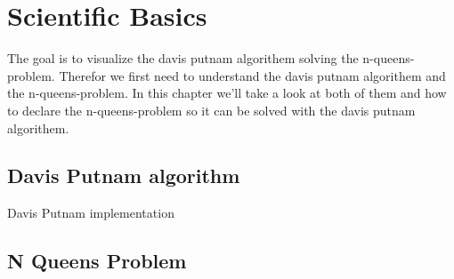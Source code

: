 

\chapter{Scientific Basics}

The goal is to visualize the davis putnam algorithem solving the n-queens-problem.
Therefor we first need to understand the davis putnam algorithem and the n-queens-problem.
In this chapter we'll take a look at both of them and how to declare the n-queens-problem so it can be solved with the davis putnam algorithem.

\section{Davis Putnam algorithm}
Davis Putnam implementation \cite{DavisPutnamImp}

\section{N Queens Problem}